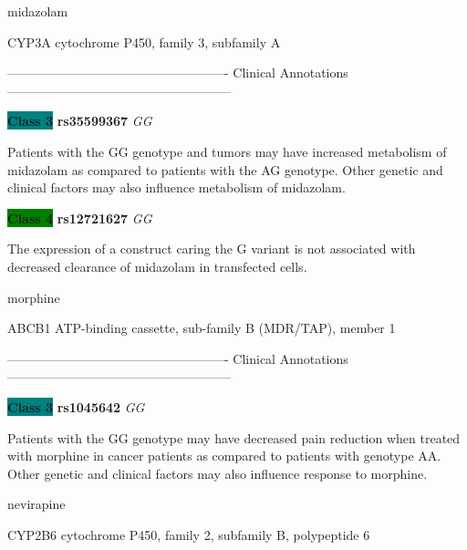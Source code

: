 \documentclass{resume} %
\begin{document}
\begin{rSection}{ midazolam }
\begin{rSubsection}{ CYP3A }{ cytochrome P450, family 3, subfamily A }{}{}
\item[] ---------------------------------------------------- Clinical Annotations -----------------------------------------------------\newline
\item \textbf{\colorbox{teal} {Class 3}} \textbf{ rs35599367 } \textit{ GG }
\item[] Patients with the GG genotype and tumors may have increased metabolism of midazolam as compared to patients with the AG genotype. Other genetic and clinical factors may also influence metabolism of midazolam. \item \textbf{\colorbox{green} {Class 4}} \textbf{ rs12721627 } \textit{ GG }
\item[] The expression of a construct caring the G variant is not associated with decreased clearance of midazolam in transfected cells.
\end{rSubsection}

\end{rSection}\begin{rSection}{ morphine }
\item[]

\begin{rSubsection}{ ABCB1 }{ ATP-binding cassette, sub-family B (MDR/TAP), member 1 }{}{}
\item[]

\item[] ---------------------------------------------------- Clinical Annotations -----------------------------------------------------\newline
\item \textbf{\colorbox{teal} {Class 3}} \textbf{ rs1045642 } \textit{ GG }
\item[] Patients with the GG genotype may have decreased pain reduction when treated with morphine in cancer patients as compared to patients with genotype AA. Other genetic and clinical factors may also influence response to morphine.
\end{rSubsection}

\end{rSection}\begin{rSection}{ nevirapine }
\item[]

\begin{rSubsection}{ CYP2B6 }{ cytochrome P450, family 2, subfamily B, polypeptide 6 }{}{}
\item[]


\end{rSubsection}
\end{rSection}
\end{document}
